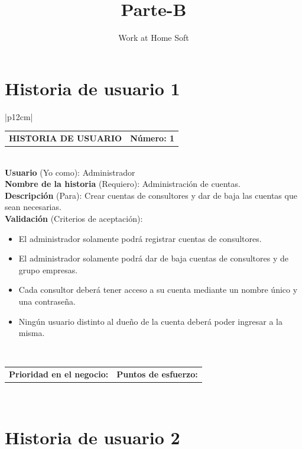 \documentclass[11pt,letterpaper]{report}
\title{\Huge Parte-B}
\author{Work at Home Soft}
\begin{document}
	
	\tableofcontents
	
	\section{Historia de usuario 1}
	\begin{center}	
	\begin{tabular}{|p{12cm}|}
		\hline
		\begin{tabular}{c|c}
			\textbf{HISTORIA DE USUARIO} & \textbf{Número: 1} \\
		\end{tabular} \\ \hline
		\textbf{Usuario} (Yo como): Administrador \\ \hline
		\textbf{Nombre de la historia} (Requiero): Administración de cuentas. \\ \hline
		\textbf{Descripción} (Para): Crear cuentas de consultores y dar de baja las cuentas que sean necesarias. \\ \hline
		\textbf{Validación} (Criterios de aceptación): \\
		\begin{minipage}{12cm}
			\begin{itemize}
				\item El administrador solamente podrá registrar cuentas de consultores.
				\item El administrador solamente podrá dar de baja cuentas de consultores y de grupo empresas.
				\item Cada consultor deberá tener acceso a su cuenta mediante un nombre único y una contraseña.
				\item Ningún usuario distinto al dueño de la cuenta deberá poder ingresar a la misma.
			\end{itemize}
		\end{minipage} \\ \hline
				\begin{tabular}{c|c}
					\textbf{Prioridad en el negocio: } & \textbf{Puntos de esfuerzo: } \\
				\end{tabular} \\ \hline
	\end{tabular}
	\end{center}
	
	\section{Historia de usuario 2}
	
\end{document}
